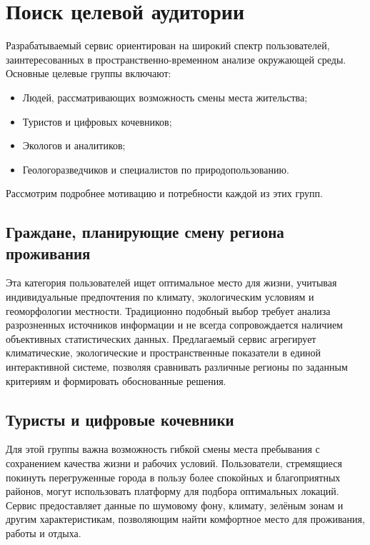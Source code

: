 \chapter{Поиск целевой аудитории}

Разрабатываемый сервис ориентирован на широкий спектр пользователей, заинтересованных в пространственно-временном анализе окружающей среды. Основные целевые группы включают:

\begin{itemize}
	\item Людей, рассматривающих возможность смены места жительства;
	\item Туристов и цифровых кочевников;
	\item Экологов и аналитиков;
	\item Геологоразведчиков и специалистов по природопользованию.
\end{itemize}

Рассмотрим подробнее мотивацию и потребности каждой из этих групп.

\section*{Граждане, планирующие смену региона проживания}

Эта категория пользователей ищет оптимальное место для жизни, учитывая индивидуальные предпочтения по климату, экологическим условиям и геоморфологии местности. Традиционно подобный выбор требует анализа разрозненных источников информации и не всегда сопровождается наличием объективных статистических данных. Предлагаемый сервис агрегирует климатические, экологические и пространственные показатели в единой интерактивной системе, позволяя сравнивать различные регионы по заданным критериям и формировать обоснованные решения.

\section*{Туристы и цифровые кочевники}

Для этой группы важна возможность гибкой смены места пребывания с сохранением качества жизни и рабочих условий. Пользователи, стремящиеся покинуть перегруженные города в пользу более спокойных и благоприятных районов, могут использовать платформу для подбора оптимальных локаций. Сервис предоставляет данные по шумовому фону, климату, зелёным зонам и другим характеристикам, позволяющим найти комфортное место для проживания, работы и отдыха.

